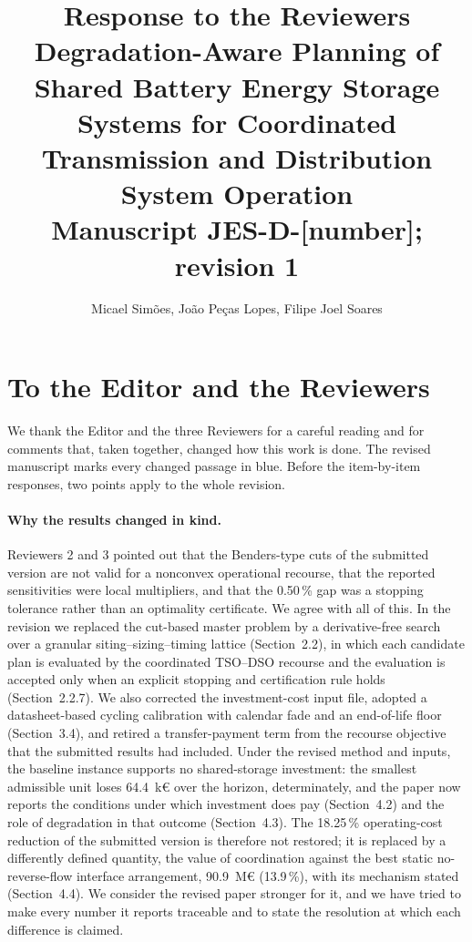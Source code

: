 \documentclass[11pt]{article}
\title{Response to the Reviewers\\
\large Degradation-Aware Planning of Shared Battery Energy Storage Systems for Coordinated Transmission and Distribution System Operation\\
\normalsize Manuscript JES-D-[number]; revision 1}
\author{Micael Sim\~oes, Jo\~ao Pe\c{c}as Lopes, Filipe Joel Soares}
\date{}
\begin{document}
\maketitle

\section*{To the Editor and the Reviewers}

We thank the Editor and the three Reviewers for a careful reading and for comments that, taken
together, changed how this work is done. The revised manuscript marks every changed passage in blue.
Before the item-by-item responses, two points apply to the whole revision.

\paragraph{Why the results changed in kind.}
Reviewers 2 and 3 pointed out that the Benders-type cuts of the submitted version are not valid for a
nonconvex operational recourse, that the reported sensitivities were local multipliers, and that the
0.50\,\% gap was a stopping tolerance rather than an optimality certificate. We agree with all of this. In
the revision we replaced the cut-based master problem by a derivative-free search over a granular
siting--sizing--timing lattice (Section~2.2), in which each candidate plan is evaluated by the
coordinated TSO--DSO recourse and the evaluation is accepted only when an explicit stopping and
certification rule holds (Section~2.2.7). We also corrected the investment-cost input file, adopted a
datasheet-based cycling calibration with calendar fade and an end-of-life floor (Section~3.4), and
retired a transfer-payment term from the recourse objective that the submitted results had included. Under
the revised method and inputs, the baseline instance supports no shared-storage investment: the smallest
admissible unit loses 64.4~k\euro{} over the horizon, determinately, and the paper now reports the
conditions under which investment does pay (Section~4.2) and the role of degradation in that outcome
(Section~4.3). The 18.25\,\% operating-cost reduction of the submitted version is therefore not restored;
it is replaced by a differently defined quantity, the value of coordination against the best static
no-reverse-flow interface arrangement, 90.9~M\euro{} (13.9\,\%), with its mechanism stated
(Section~4.4). We consider the revised paper stronger for it, and we have tried to make every number it
reports traceable and to state the resolution at which each difference is claimed.
\end{document}
